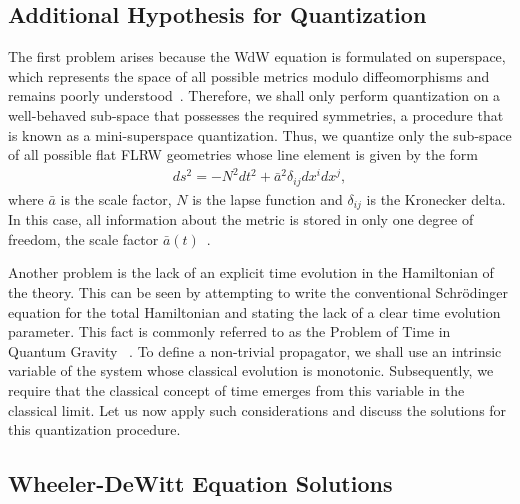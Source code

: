 \documentclass[a4paper,11pt]{article}
\begin{document}
\subsection{Additional Hypothesis for Quantization}

The first problem arises because the WdW equation is formulated on superspace, which
represents the space of all possible metrics modulo diffeomorphisms and remains poorly
understood~\cite{halliwell1990introductory,dewitt1967}. Therefore, we shall only perform
quantization on a well-behaved sub-space that possesses the required symmetries, a
procedure that is known as a mini-superspace quantization. Thus, we quantize only the
sub-space of all possible flat FLRW geometries whose line element is given by the form
\begin{align}
	\label{physmetric}
	ds^2 = -N^{2}dt^2 + \bar{a}^2 \delta_{ij}dx^i dx^j
	,\end{align}
where $\bar{a}$ is the scale factor, $N$ is the lapse function and $\delta_{ij}$ is the
Kronecker delta. In this case, all information about the metric is stored in only one
degree of freedom, the scale factor $\bar{a}(t)$~\cite{nelson2021bouncing}.

Another problem is the lack of an explicit time evolution in the Hamiltonian of the
theory. This can be seen by attempting to write the conventional Schrödinger equation
for the total Hamiltonian and stating the lack of a clear time evolution parameter. This
fact is commonly referred to as the Problem of Time in Quantum Gravity ~\cite
{patrick_time_review,nelson_peter_bouncing_original,bianchi_time}. To define a
non-trivial propagator, we shall use an intrinsic variable of the system whose classical
evolution is monotonic. Subsequently, we require that the classical concept of time
emerges from this variable in the classical limit. Let us now apply such considerations
and discuss the solutions for this quantization procedure.

\subsection{Wheeler-DeWitt Equation Solutions}
\end{document}
